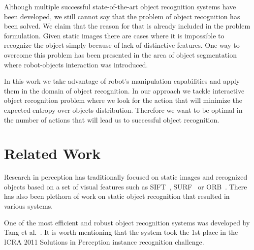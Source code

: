 \documentclass[conference]{IEEEtran}
\begin{document}
Although multiple successful state-of-the-art object recognition systems have been developed, we still cannot say that the problem of object recognition has been solved.
We claim that the reason for that is already included in the problem formulation. Given static images there are cases where it is impossible to recognize the object simply because of lack of distinctive features. One way to overcome this problem has been presented in the area of object segmentation where robot-objects interaction was introduced. 

In this work we take advantage of robot's manipulation capabilities and apply them in the domain of object recognition. In our approach we tackle interactive object recognition problem where we look for the action that will minimize the expected entropy over objects distribution. Therefore we want to be optimal in the number of actions that will lead us to successful object recognition.



\section{Related Work}



	Research in perception has traditionally focused on  static 
images and recognized objects based on a set of visual features  such as SIFT~\cite{lowe2004distinctive}, SURF~\cite{bay2006surf} or ORB~\cite{rublee2011orb}.
There has also been plethora of work on static object recognition that resulted in various systems.
	
	One of the most efficient and robust object recognition systems was developed by Tang et al.~\cite{tang2012textured}. It is worth mentioning that the system took the 1st place in the ICRA 2011 Solutions in Perception instance recognition challenge. %
\end{document}
